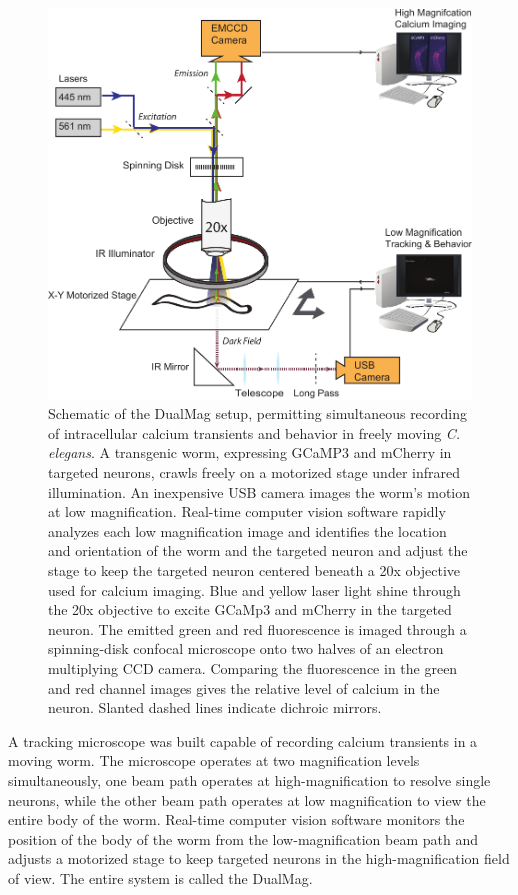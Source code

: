 \begin{figure} %
\includegraphics[width=\textwidth]{figures/omegaCalciumImagingSetup}
\caption[DualMag system apparatus.]{Schematic of the DualMag setup, permitting simultaneous recording of intracellular calcium transients and behavior in freely moving \textit{C. elegans}.  A transgenic worm, expressing GCaMP3 and mCherry in targeted neurons, crawls freely on a motorized stage under infrared illumination. An inexpensive USB camera images the worm's motion at low magnification. Real-time computer vision software rapidly analyzes each low magnification image and identifies the location and orientation of the worm and the targeted neuron and adjust the stage to keep the targeted neuron centered beneath a 20x objective used for calcium imaging.  Blue and yellow laser light shine through the 20x objective to excite GCaMp3 and mCherry in the targeted neuron. The emitted green and red fluorescence  is imaged through a spinning-disk confocal microscope onto two halves of an electron multiplying CCD camera.  Comparing the fluorescence in the green and red  channel images gives the relative level of calcium in the neuron. Slanted dashed lines indicate dichroic mirrors. \label{fig:omegaSchematic}}
\end{figure}



A tracking microscope was built capable of recording calcium transients in a moving worm. The microscope operates at two magnification levels simultaneously, one beam path operates at high-magnification to resolve single neurons, while the other beam path operates at low  magnification to view the entire body of the worm. Real-time computer vision software monitors the position of the body of the worm from the low-magnification beam path and adjusts a motorized stage to keep targeted neurons in the high-magnification field of view. The entire system is called the DualMag.


